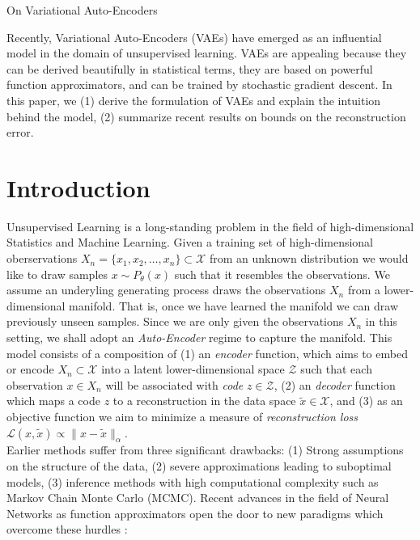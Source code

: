 \documentclass[11pt]{article}
\theoremstyle{plain}
\theoremstyle{definition}
\theoremstyle{plain}
\begin{document}
	
\begin{center}
{\huge On Variational Auto-Encoders} 
\end{center}

Recently, Variational Auto-Encoders (VAEs) have emerged as an influential
model in the domain of unsupervised learning. VAEs are appealing because
they can be derived beautifully in statistical terms, they are based
on powerful function approximators, and can be trained by stochastic
gradient descent. In this paper, we (1) derive the formulation of
VAEs and explain the intuition behind the model, (2) summarize recent
results on bounds on the reconstruction error. 

\section{Introduction}

Unsupervised Learning is a long-standing problem in the field of high-dimensional
Statistics and Machine Learning. Given a training set of high-dimensional
oberservations $X_{n}=\{x_{1},x_{2},\ldots,x_{n}\}\subset\mathcal{X}$
from an unknown distribution we would like to draw samples $x\sim P_{\theta}(x)$
such that it resembles the observations. We assume an underyling generating
process draws the observations $X_{n}$ from a lower-dimensional manifold.
That is, once we have learned the manifold we can draw previously
unseen samples. Since we are only given the observations $X_{n}$
in this setting, we shall adopt an \textit{Auto-Encoder }regime to
capture the manifold. This model consists of a composition of (1)
an \textit{encoder} function, which aims to embed or encode $X_{n}\subset\mathcal{X}$
into a latent lower-dimensional space $\mathcal{Z}$ such that each
observation $x\in X_{n}$ will be associated with\textit{ code} $z\in\mathcal{Z}$,
(2) an \textit{decoder} function which maps a code $z$ to a reconstruction
in the data space $\tilde{x}\in\mathcal{X}$, and (3) as an objective
function we aim to minimize a measure of \textit{reconstruction loss}
$\mathcal{L}(x,\tilde{x})\propto\lVert x-\tilde{x}\rVert_{\alpha}$.
\\
Earlier methods suffer from three significant drawbacks: (1) Strong
assumptions on the structure of the data, (2) severe approximations
leading to suboptimal models, (3) inference methods with high computational
complexity such as Markov Chain Monte Carlo (MCMC). Recent advances
in the field of Neural Networks as function approximators open the
door to new paradigms which overcome these hurdles \cite{journals/corr/KingmaW13}:\\
\end{document}

